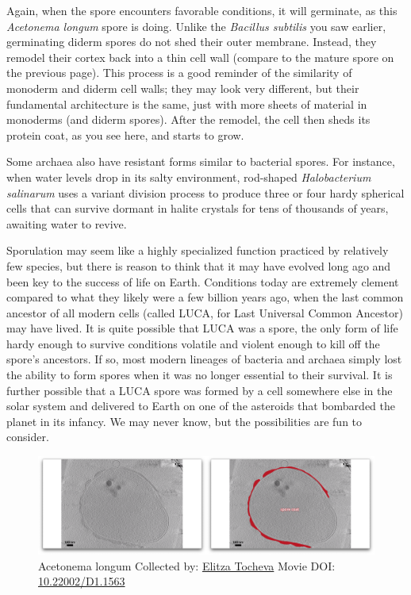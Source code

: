 \documentclass[]{tufte-book}
\begin{document}
Again, when the spore encounters favorable conditions, it will
germinate, as this \emph{Acetonema longum} spore is doing. Unlike the
\emph{Bacillus subtilis} you saw earlier, germinating diderm spores do
not shed their outer membrane. Instead, they remodel their cortex back
into a thin cell wall (compare to the mature spore on the previous
page). This process is a good reminder of the similarity of monoderm and
diderm cell walls; they may look very different, but their fundamental
architecture is the same, just with more sheets of material in monoderms
(and diderm spores). After the remodel, the cell then sheds its protein
coat, as you see here, and starts to grow.

Some archaea also have resistant forms similar to bacterial spores. For
instance, when water levels drop in its salty environment, rod-shaped
\emph{Halobacterium salinarum} uses a variant division process to
produce three or four hardy spherical cells that can survive dormant in
halite crystals for tens of thousands of years, awaiting water to
revive.

Sporulation may seem like a highly specialized function practiced by
relatively few species, but there is reason to think that it may have
evolved long ago and been key to the success of life on Earth.
Conditions today are extremely clement compared to what they likely were
a few billion years ago, when the last common ancestor of all modern
cells (called LUCA, for Last Universal Common Ancestor) may have lived.
It is quite possible that LUCA was a spore, the only form of life hardy
enough to survive conditions volatile and violent enough to kill off the
spore's ancestors. If so, most modern lineages of bacteria and archaea
simply lost the ability to form spores when it was no longer essential
to their survival. It is further possible that a LUCA spore was formed
by a cell somewhere else in the solar system and delivered to Earth on
one of the asteroids that bombarded the planet in its infancy. We may
never know, but the possibilities are fun to consider.





\begin{figure}
\includegraphics{movie_stills/8_11} \caption[Acetonema longum Collected by:
\protect\hyperlink{elitza_tocheva}{Elitza Tocheva} Movie DOI:
\href{https://doi.org/10.22002/D1.1563}{10.22002/D1.1563}]{Acetonema longum Collected by:
\protect\hyperlink{elitza_tocheva}{Elitza Tocheva} Movie DOI:
\href{https://doi.org/10.22002/D1.1563}{10.22002/D1.1563}}\label{fig:8-11}
\end{figure}
\end{document}
